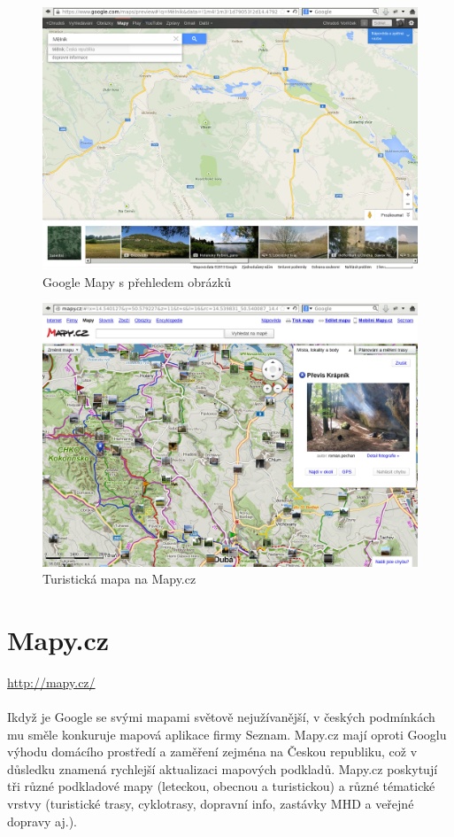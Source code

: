 \documentclass[11pt,a4paper,titlepage,oneside]{book}
\begin{document}
		\begin{figure}[!h]
			\begin{center}
				\includegraphics[width=12cm]{obrazky/googleMaps.png}
				\caption{Google Mapy s přehledem obrázků}
			\end{center}
		\end{figure}

			\begin{figure}[!h]
				\begin{center}
					\includegraphics[width=12cm]{obrazky/mapycz.png}
					\caption{Turistická mapa na Mapy.cz}
				\end{center}
			\end{figure}

	\section{Mapy.cz}
		\url{http://mapy.cz/}
		\paragraph{} Ikdyž je Google se svými mapami světově nejužívanější, v českých podmínkách mu směle konkuruje mapová aplikace firmy Seznam. Mapy.cz mají oproti Googlu výhodu domácího prostředí a zaměření zejména na Českou republiku, což v důsledku znamená rychlejší aktualizaci mapových podkladů. Mapy.cz poskytují tři různé podkladové mapy (leteckou, obecnou a turistickou) a různé tématické vrstvy (turistické trasy, cyklotrasy, dopravní info, zastávky MHD a veřejné dopravy aj.). 
\end{document}
